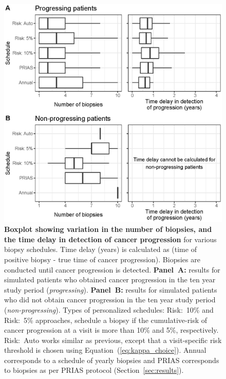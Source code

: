 \begin{figure}
\centerline{\includegraphics{images/simulation_boxplot.eps}}
\caption{\textbf{Boxplot showing variation in the number of biopsies, and the time delay in detection of cancer progression} for various biopsy schedules. Time delay (years) is calculated as (time of positive biopsy - true time of cancer progression). Biopsies are conducted until cancer progression is detected. \textbf{Panel~A:} results for simulated patients who obtained cancer progression in the ten year study period (\textit{progressing}). \textbf{Panel~B:} results for simulated patients who did not obtain cancer progression in the ten year study period (\textit{non-progressing}). Types of personalized schedules: Risk:~10\% and Risk:~5\% approaches, schedule a biopsy if the cumulative-risk of cancer progression at a visit is more than 10\% and 5\%, respectively. Risk:~Auto works similar as previous, except that a visit-specific risk threshold is chosen using Equation~(\ref{eq:kappa_choice}). Annual corresponds to a schedule of yearly biopsies and PRIAS corresponds to biopsies as per PRIAS protocol (Section~\ref{sec:results}).}
\label{fig:simulation_boxplot}
\end{figure}